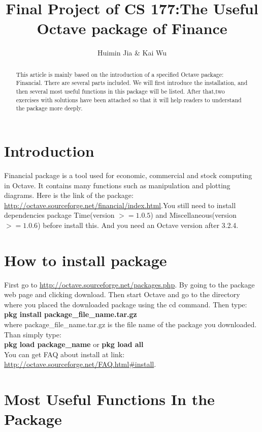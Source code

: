 \documentclass[11pt]{article}
\title{Final Project of CS 177:The Useful Octave package of Finance}
\author{Huimin Jia \& Kai Wu}
\begin{document}
  \maketitle
  \begin{abstract}
  This article is mainly based on the introduction of a specified Octave package: Financial. There are several parts included. We will first introduce the installation, and then several most useful functions in this package will be listed. After that,two exercises with solutions have been attached so that it will help readers to understand the package more deeply. 
  \end{abstract}

  \section{Introduction}
    Financial package is a tool used for economic, commercial and stock computing in Octave. It contains many functions such as manipulation and plotting diagrams. Here is the link of the package: \url{http://octave.sourceforge.net/financial/index.html}.You still need to install dependencies package Time(version $>= 1.0.5$) and Miscellaneous(version $>=1.0.6$) before install this. And you need an Octave version after 3.2.4.


  \section{How to install package}
    First go to \url{http://octave.sourceforge.net/packages.php}. By going to the package web page and clicking download. Then start Octave and go to the directory where you placed the downloaded package using the cd command. Then type:
\\\textbf{pkg install package\_file\_name.tar.gz}
\\where package\_file\_name.tar.gz is the file name of the package you downloaded. Than simply type:
\\\textbf{pkg load package\_name} or \textbf{pkg load all}
\\You can get FAQ about install at link: \url{http://octave.sourceforge.net/FAQ.html\#install}.


  \section{Most Useful Functions In the Package}
\end{document}
